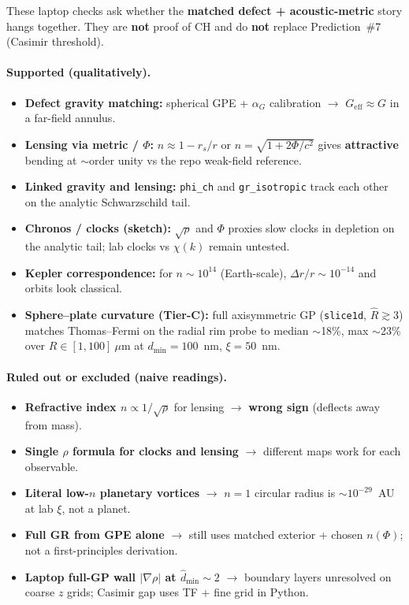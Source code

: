 \documentclass[11pt,a4paper]{article}
\begin{document}
These laptop checks ask whether the \textbf{matched defect + acoustic-metric} story hangs together.
They are \textbf{not} proof of CH and do \textbf{not} replace Prediction~\#7 (Casimir threshold).

\paragraph{Supported (qualitatively).}
\begin{itemize}[leftmargin=*]
  \item \textbf{Defect gravity matching:} spherical GPE + $\alpha_G$ calibration $\to$ $G_{\mathrm{eff}} \approx G$ in a far-field annulus.
  \item \textbf{Lensing via metric / $\Phi$:} $n \approx 1 - r_s/r$ or $n = \sqrt{1 + 2\Phi/c^2}$ gives \textbf{attractive} bending at $\sim$order unity vs the repo weak-field reference.
  \item \textbf{Linked gravity and lensing:} \texttt{phi\_ch} and \texttt{gr\_isotropic} track each other on the analytic Schwarzschild tail.
  \item \textbf{Chronos / clocks (sketch):} $\sqrt{\rho}$ and $\Phi$ proxies slow clocks in depletion on the analytic tail; lab clocks vs $\chi(k)$ remain untested.
  \item \textbf{Kepler correspondence:} for $n \sim 10^{14}$ (Earth-scale), $\Delta r/r \sim 10^{-14}$ and orbits look classical.
  \item \textbf{Sphere--plate curvature (Tier-C):} full axisymmetric GP (\texttt{slice1d}, $\hat{R}\gtrsim 3$) matches Thomas--Fermi on the radial rim probe to median $\sim$18\%, max $\sim$23\% over $R \in [1,100]~\mu\mathrm{m}$ at $d_{\min}=100$~nm, $\xi=50$~nm.
\end{itemize}

\paragraph{Ruled out or excluded (naive readings).}
\begin{itemize}[leftmargin=*]
  \item \textbf{Refractive index $n \propto 1/\sqrt{\rho}$} for lensing $\to$ \textbf{wrong sign} (deflects away from mass).
  \item \textbf{Single $\rho$ formula for clocks and lensing} $\to$ different maps work for each observable.
  \item \textbf{Literal low-$n$ planetary vortices} $\to$ $n=1$ circular radius is $\sim 10^{-29}$~AU at lab $\xi$, not a planet.
  \item \textbf{Full GR from GPE alone} $\to$ still uses matched exterior + chosen $n(\Phi)$; not a first-principles derivation.
  \item \textbf{Laptop full-GP wall $|\nabla\rho|$ at $\hat{d}_{\min}\sim 2$} $\to$ boundary layers unresolved on coarse $z$ grids; Casimir gap uses TF + fine grid in Python.
\end{itemize}
\end{document}
